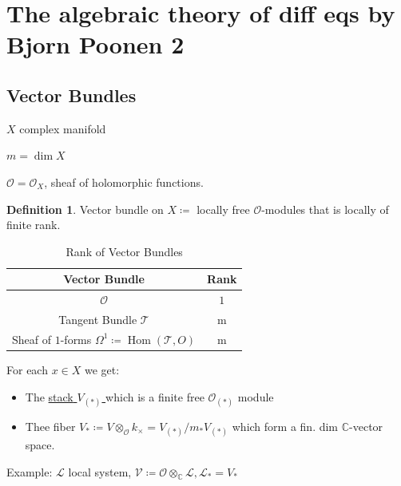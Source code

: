 \documentclass{article}
\theoremstyle{definition}
\newtheorem*{definition}{Definition}
\begin{document}
    \section*{The algebraic theory of diff eqs by Bjorn Poonen 2}

    \subsection*{Vector Bundles}

    \(X\) complex manifold

    \(m = \dim X\) 

    \(\mathcal{O} = \mathcal{O}_X\), sheaf of holomorphic functions.

    \begin{definition}
        Vector bundle on \(X \coloneqq\) locally free \(\mathcal{O}\)-modules that is locally of finite rank.
    \end{definition}


    \begin{table}[H]
        \centering
        \begin{tabular}{c|c}
            \toprule
                Vector Bundle & Rank \\
            \midrule
                \(\mathcal{O}\) & \(1\)  \\
                Tangent Bundle \(\mathcal{T}\)  & m \\
                Sheaf of \(1\)-forms \(\Omega^1 \coloneqq \operatorname{Hom}(\mathcal{T} , O)\) & m \\
            \bottomrule
        \end{tabular}
        \caption{Rank of Vector Bundles}
    \end{table}

    For each \(x\in X\) we get:

    \begin{itemize}
        \item The \underline{stack{ \(V_{(\ast)}\) }} which is a finite free \(\mathcal{O}_{(\ast)}\) module
        \item Thee fiber \(V_{\ast} \coloneqq V \otimes_{\mathcal{O}} k_\times = V_{(\ast)} / m_{\ast} V_{(\ast)}\) which form a fin. dim \(\mathbb{C}\)-vector space.   
    \end{itemize} 

    Example: \(\mathcal{L}\) local system, \(\mathcal{V} \coloneqq \mathcal{O} \otimes_{\mathbb{C}} \mathcal{L}, \mathcal{L}_{\ast} = V_{\ast} \)
\end{document}
